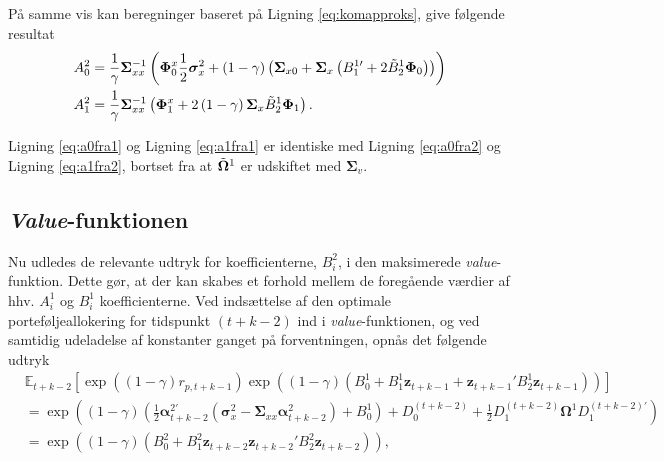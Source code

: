 \documentclass[
  a4paper,
  oneside]{memoir}
\begin{document}
På samme vis kan beregninger baseret på Ligning \eqref{eq:komapproks}, give følgende resultat
\begin{align}
A_0^2&=\frac{1}{\gamma} \bm{\Sigma}_{xx}^{-1} \left(\bm{\Phi}_0^x \frac{1}{2} \bm{\sigma}_x^2 + \left(1-\gamma \right) \left(\bm{\Sigma}_{x0} + \bm{\Sigma}_x \left(B_1^{1\prime} + 2\Tilde{B}_2^{1}\bm{\Phi}_0 \right)\right)\right)\label{eq:a0fra2}\\
A_1^2&=\frac{1}{\gamma} \bm{\Sigma}_{xx}^{-1} \left(\bm{\Phi}_1^x + 2\left(1-\gamma\right) \bm{\Sigma}_x \Tilde{B}_2^{1}\bm{\Phi}_1\right).\label{eq:a1fra2}
\end{align}

Ligning \eqref{eq:a0fra1} og Ligning \eqref{eq:a1fra1} er identiske med Ligning \eqref{eq:a0fra2} og Ligning \eqref{eq:a1fra2}, bortset fra at \(\Tilde{\bm{\Omega}}^1\) er udskiftet med \(\bm{\Sigma}_v\).

\hypertarget{value-funktionen-1}{%
\subsection{\texorpdfstring{\emph{Value}-funktionen}{Value-funktionen}}\label{value-funktionen-1}}

Nu udledes de relevante udtryk for koefficienterne, \(B_i^2\), i den maksimerede \emph{value}-funktion. Dette gør, at der kan skabes et forhold mellem de foregående værdier af hhv. \(A_i^1\) og \(B_i^1\) koefficienterne. Ved indsættelse af den optimale porteføljeallokering for tidspunkt \(\left(t+k-2\right)\) ind i \emph{value}-funktionen, og ved samtidig udeladelse af konstanter ganget på forventningen, opnås det følgende udtryk
\begin{align*}
&\mathbb{E}_{t+k-2}[ \exp\left( \left(1-\gamma\right)  r_{p,t+k-1}\right)\exp \left( \left(1-\gamma\right) \left(B_0^1 + B_1^1\bm{z}_{t+k-1}  + \bm{z}_{t+k-1}' B_2^1 \bm{z}_{t+k-1}  \right)\right)]\\
&=\exp\left(\left(1-\gamma\right)\left(\frac{1}{2}\bm{\alpha}_{t+k-2}^{2\prime} \left(\bm{\sigma}_x^2 - \bm{\Sigma}_{xx} \bm{\alpha}_{t+k-2}^2\right) + B_0^1 \right) + D_0^{\left(t+k-2\right)} + \frac{1}{2} D_1^{\left(t+k-2\right)} \bm{\Omega}^1 D_1^{\left(t+k-2\right)\prime}\right)\\
&=\exp\left(\left(1-\gamma\right)\left(B_0^2 + B_1^2 \bm{z}_{t+k-2} \bm{z}_{t+k-2}' B_2^2 \bm{z}_{t+k-2} \right)\right),
\end{align*}
\end{document}
